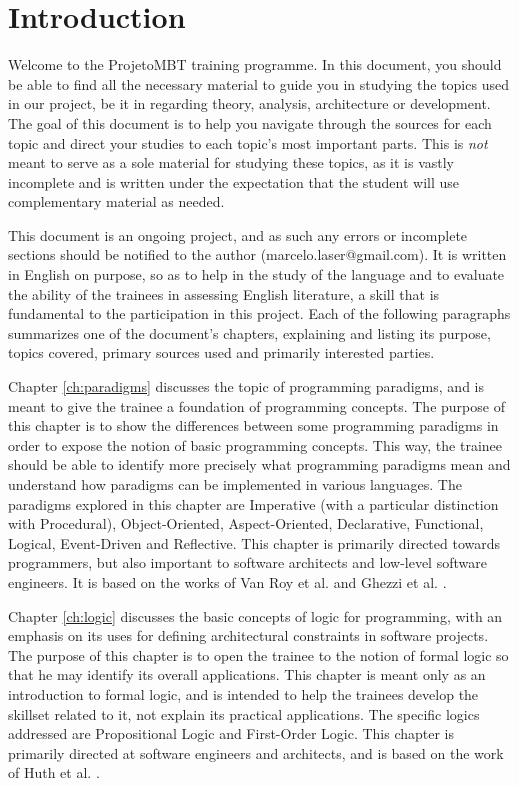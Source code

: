 \chapter*{Introduction}

Welcome to the ProjetoMBT training programme. In this document, you should be able to find all the necessary material to guide you in studying the topics used in our project, be it in regarding theory, analysis, architecture or development. The goal of this document is to help you navigate through the sources for each topic and direct your studies to each topic's most important parts. This is \emph{not} meant to serve as a sole material for studying these topics, as it is vastly incomplete and is written under the expectation that the student will use complementary material as needed.

This document is an ongoing project, and as such any errors or incomplete sections should be notified to the author (marcelo.laser@gmail.com). It is written in English on purpose, so as to help in the study of the language and to evaluate the ability of the trainees in assessing English literature, a skill that is fundamental to the participation in this project. Each of the following paragraphs summarizes one of the document's chapters, explaining and listing its purpose, topics covered, primary sources used and primarily interested parties.

Chapter \ref{ch:paradigms} discusses the topic of programming paradigms, and is meant to give the trainee a foundation of programming concepts. The purpose of this chapter is to show the differences between some programming paradigms in order to expose the notion of basic programming concepts. This way, the trainee should be able to identify more precisely what programming paradigms mean and understand how paradigms can be implemented in various languages. The paradigms explored in this chapter are Imperative (with a particular distinction with Procedural), Object-Oriented, Aspect-Oriented, Declarative, Functional, Logical, Event-Driven and Reflective. This chapter is primarily directed towards programmers, but also important to software architects and low-level software engineers. It is based on the works of Van Roy et al. \cite{VANROY:2004} and Ghezzi et al. \cite{GHEZZI:1997}.

Chapter \ref{ch:logic} discusses the basic concepts of logic for programming, with an emphasis on its uses for defining architectural constraints in software projects. The purpose of this chapter is to open the trainee to the notion of formal logic so that he may identify its overall applications. This chapter is meant only as an introduction to formal logic, and is intended to help the trainees develop the skillset related to it, not explain its practical applications. The specific logics addressed are Propositional Logic and First-Order Logic. This chapter is primarily directed at software engineers and architects, and is based on the work of Huth et al. \cite{HUTH:2004}.

